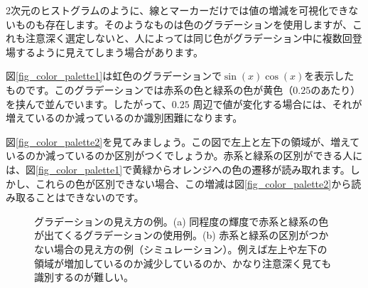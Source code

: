 2次元のヒストグラムのように、線とマーカーだけでは値の増減を可視化できないものも存在します。そのようなものは色のグラデーションを使用しますが、これも注意深く選定しないと、人によっては同じ色がグラデーション中に複数回登場するように見えてしまう場合があります。

図\ref{fig_color_palette1}は虹色のグラデーションで$\sin(x)\cos(x)$を表示したものです。このグラデーションでは赤系の色と緑系の色が黄色（$0.25$のあたり）を挟んで並んでいます。したがって、$0.25$ 周辺で値が変化する場合には、それが増えているのか減っているのか識別困難になります。

図\ref{fig_color_palette2}を見てみましょう。この図で左上と左下の領域が、増えているのか減っているのか区別がつくでしょうか。赤系と緑系の区別ができる人には、図\ref{fig_color_palette1}で黄緑からオレンジへの色の遷移が読み取れます。しかし、これらの色が区別できない場合、この増減は図\ref{fig_color_palette2}から読み取ることはできないのです。

\begin{figure}
  \centering
  \caption[グラデーションの見え方の例]{グラデーションの見え方の例。(a) 同程度の輝度で赤系と緑系の色が出てくるグラデーションの使用例。(b) 赤系と緑系の区別がつかない場合の見え方の例（シミュレーション）。例えば左上や左下の領域が増加しているのか減少しているのか、かなり注意深く見ても識別するのが難しい。}
\end{figure}

